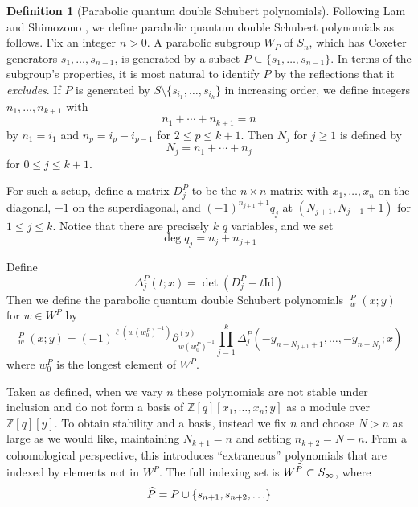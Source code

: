 \documentclass{amsart}
\theoremstyle{definition}
\newtheorem{definition}[lemma]{Definition}
\theoremstyle{remark}
\numberwithin{equation}{section}
\DeclareMathOperator{\qsch}{\widetilde{\mathfrak{S}}}
\begin{document}
\begin{definition}[Parabolic quantum double Schubert polynomials]
	Following Lam and Shimozono \cite{lam2014quantum}, we define parabolic quantum double Schubert polynomials as follows. Fix an integer $n>0$. A parabolic subgroup $W_P$ of $S_{n}$, which has Coxeter generators $s_1,\ldots,s_{n-1}$, is generated by a subset $P\subseteq \{s_1,\ldots,s_{n-1}\}$. In terms of the subgroup's properties, it is most natural to identify $P$ by the reflections that it \emph{excludes}. If $P$ is generated by $S\setminus \{s_{i_1},\ldots,s_{i_k}\}$ in increasing order, we define integers $n_1,\ldots,n_{k+1}$ with
	$$n_1+\cdots+n_{k+1}=n$$
	by $n_1 = i_1$ and $n_p = i_{p} - i_{p-1}$ for $2\leq p\leq k+1$. Then $N_j$ for $j\geq 1$ is defined by
	$$N_j = n_1+\cdots+n_j$$
	for $0\leq j\leq k+1$.
	
	For such a setup, define a matrix $D^P_j$ to be the $n\times n$ matrix with $x_1,\ldots,x_n$ on the diagonal, $-1$ on the superdiagonal, and $(-1)^{n_{j+1}+1}q_j$ at $(N_{j+1},N_{j-1}+1)$ for $1\leq j\leq k$. Notice that there are precisely $k$ $q$ variables, and we set
	$$\deg q_j = n_j + n_{j+1}$$  
	
	Define 
	$$\Delta^P_j(t;x)=\det(D^P_j-t\mathrm{Id})$$
	Then we define the parabolic quantum double Schubert polynomials $\qsch_w^P(x;y)$ for $w\in W^P$ by
	$$\qsch^P_w(x;y)=(-1)^{\ell(w(w_0^P)^{-1})}\partial_{w(w_0^P)^{-1}}^{(y)}\prod_{j=1}^k \Delta^P_j(-y_{n - N_{j+1}+1},\ldots,-y_{n-N_j};x)$$
	where $w_0^P$ is the longest element of $W^P$. 
	
	Taken as defined, when we vary $n$ these polynomials are not stable under inclusion and do not form a basis of $\mathbb{Z}[q][x_1,\ldots,x_n;y]$ as a module over $\mathbb{Z}[q][y]$. To obtain stability and a basis, instead we fix $n$ and choose $N>n$ as large as we would like, maintaining $N_{k+1}=n$ and setting $n_{k+2} = N-n$. From a cohomological perspective, this introduces ``extraneous'' polynomials that are indexed by elements not in $W^P$. The full indexing set is $W^{\widehat{P}}\subset S_\infty$, where
	$$\widehat{P} = P \cup \{s_{n+1},s_{n+2},\ldots\}$$
\end{definition}
\end{document}
